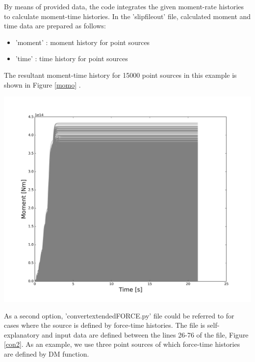 By means of provided data, the code integrates the given moment-rate histories to calculate moment-time histories. In the 'slipfile\textunderscore out' file, calculated moment and time data are prepared as follows:
\begin{itemize}
\item 'moment'    : moment history for point sources \\
\item 'time'      : time history for point sources    \\
\end{itemize}



The resultant moment-time history for 15000 point sources in this example is shown in Figure \ref{momo} .

\begin{center}
\leavevmode
\includegraphics[scale=0.45]{figures/Moment_vs_time_Napa_bedrock_model.png} 
\label{momo} 
\vspace{1cm}
\end{center}






 
As a second option, 'convert\textunderscore extended\textunderscore FORCE.py' file could be referred to for cases where the source is defined by force-time histories. The file is self-explanatory and input data are defined between the lines 26-76 of the file, Figure \ref{con2}. As an example, we use three point sources of which force-time histories are defined by DM function. \\


